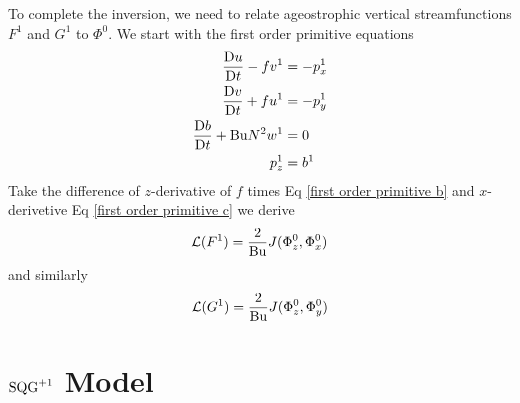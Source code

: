 \documentclass[../SQG_notes.tex]{subfiles}
\begin{document}
    To complete the inversion, we need to relate ageostrophic vertical streamfunctions $F^1$ and $G^1$ to $\Phi^0$. We start with the first order primitive equations 
    \begin{subequations}
        \begin{align}
                \frac{\mathrm{D} u}{\mathrm{D} t} - f v^1 &= -p_x^1 \\
                \frac{\mathrm{D} v}{\mathrm{D} t} + fu^1 &= -p_y^1 \label{first order primitive b}\\
                \frac{\mathrm{D} b}{\mathrm{D} t} + \text{Bu} N^2  w^1 &= 0 \label{first order primitive c}\\
                p_z^1 &= b^1
        \end{align}
    \end{subequations}
    Take the difference of $z$-derivative of $f$ times Eq \ref{first order primitive b} and $x$-derivetive Eq \ref{first order primitive c} we derive 
    \begin{equation}
        \mathcal{L}(F^1) = \frac{2}{\text{Bu}} J(\Phi_z^0, \Phi_x^0) \label{F^1 and Phi^0 relation}
    \end{equation}
    and similarly 
    \begin{equation}
        \mathcal{L}(G^1) = \frac{2}{\text{Bu}} J(\Phi_z^0, \Phi_y^0) \label{G^1 and Phi^0 relation}
    \end{equation}
\newpage

\section{\texorpdfstring{$\text{SQG}^{+1}$}{SQG1} Model}
\end{document}

